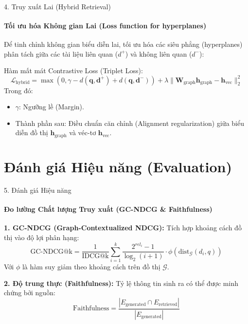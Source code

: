\documentclass[aspectratio=169,xcolor=table]{beamer}
\begin{document}
\begin{frame}{4. Truy xuất Lai (Hybrid Retrieval)}
    \framesubtitle{Tối ưu hóa Không gian Lai (Loss function for hyperplanes)}
    Để tinh chỉnh không gian biểu diễn lai, tối ưu hóa các siêu phẳng (hyperplanes) phân tách giữa các tài liệu liên quan ($d^+$) và không liên quan ($d^-$):
    
    Hàm mất mát Contrastive Loss (Triplet Loss):
    \begin{equation}
        \mathcal{L}_{\text{hybrid}} = \max\left(0, \gamma - d(\mathbf{q}, \mathbf{d}^+) + d(\mathbf{q}, \mathbf{d}^-)\right) + \lambda \|\mathbf{W}_{\text{graph}} \mathbf{h}_{\text{graph}} - \mathbf{h}_{\text{vec}}\|_2^2
    \end{equation}
    Trong đó:
    \begin{itemize}
        \item $\gamma$: Ngưỡng lề (Margin).
        \item Thành phần sau: Điều chuẩn căn chỉnh (Alignment regularization) giữa biểu diễn đồ thị $\mathbf{h}_{\text{graph}}$ và véc-tơ $\mathbf{h}_{\text{vec}}$.
    \end{itemize}
\end{frame}

\section{Đánh giá Hiệu năng (Evaluation)}

\begin{frame}{5. Đánh giá Hiệu năng}
    \framesubtitle{Đo lường Chất lượng Truy xuất (GC-NDCG \& Faithfulness)}
    \textbf{1. GC-NDCG (Graph-Contextualized NDCG):}
    Tích hợp khoảng cách đồ thị vào độ lợi phân hạng:
    \begin{equation}
        \text{GC-NDCG@k} = \frac{1}{\text{IDCG@k}} \sum_{i=1}^{k} \frac{2^{rel_i} - 1}{\log_2(i + 1)} \cdot \phi(\text{dist}_{\mathcal{G}}(d_i, q))
    \end{equation}
    Với $\phi$ là hàm suy giảm theo khoảng cách trên đồ thị $\mathcal{G}$.

    \textbf{2. Độ trung thực (Faithfulness):}
    Tỷ lệ thông tin sinh ra có thể được minh chứng bởi nguồn:
    \begin{equation}
        \text{Faithfulness} = \frac{|E_{\text{generated}} \cap E_{\text{retrieved}}|}{|E_{\text{generated}}|}
    \end{equation}
\end{frame}
\end{document}
